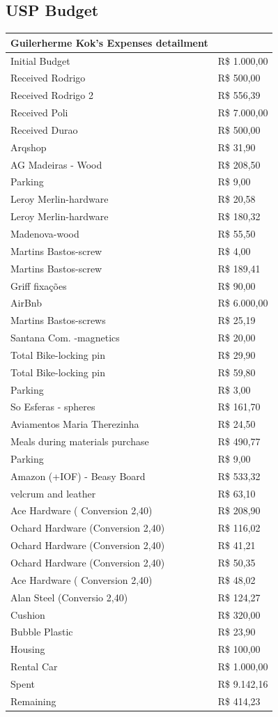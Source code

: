 \subsection{USP Budget}
\begin{tabular}{ l | l }
\hline
Guilerherme Kok's Expenses detailment \\
\hline\hline
Initial Budget &	 R\$ 1.000,00  \\
\hline
Received Rodrigo &	 R\$ 500,00 \\
Received Rodrigo 2 &	R\$ 556,39 \\
Received Poli	 &R\$ 7.000,00 \\
Received Durao &	R\$ 500,00 \\
Arqshop &	R\$ 31,90 \\
AG Madeiras - Wood &	R\$ 208,50 \\
Parking &	R\$ 9,00 \\
Leroy Merlin-hardware &	R\$ 20,58 \\
Leroy Merlin-hardware &	R\$ 180,32 \\
Madenova-wood &	R\$ 55,50 \\ 
Martins Bastos-screw &	R\$ 4,00 \\
Martins Bastos-screw &	R\$ 189,41 \\
Griff fixações &	R\$ 90,00 \\
AirBnb	 &R\$ 6.000,00 \\
Martins Bastos-screws &	R\$ 25,19 \\
Santana Com. -magnetics &	R\$ 20,00 \\
Total Bike-locking pin &	R\$ 29,90 \\
Total Bike-locking pin &	R\$ 59,80 \\
Parking &	R\$ 3,00 \\
So Esferas - spheres &	R\$ 161,70 \\
Aviamentos Maria Therezinha &	R\$ 24,50 \\
Meals during materials purchase &	R\$ 490,77 \\
Parking &	R\$ 9,00 \\
Amazon (+IOF) - Beasy Board &	R\$ 533,32 \\ 
velcrum and leather &	R\$ 63,10 \\
Ace Hardware ( Conversion 2,40) &	R\$ 208,90 \\
Ochard Hardware (Conversion 2,40) &	R\$ 116,02 \\
Ochard Hardware (Conversion 2,40) &	R\$ 41,21 \\
Ochard Hardware (Conversion 2,40) &	R\$ 50,35 \\
Ace Hardware ( Conversion 2,40) &	R\$ 48,02 \\
Alan Steel (Conversio 2,40) &	R\$ 124,27 \\
Cushion &	R\$ 320,00 \\
Bubble Plastic &	R\$ 23,90 \\
Housing &	R\$ 100,00 \\
Rental Car &	R\$ 1.000,00 \\
\hline \hline
Spent &	R\$ 9.142,16 \\
\hline 
Remaining &	R\$ 414,23 \\

\hline
\end{tabular}

